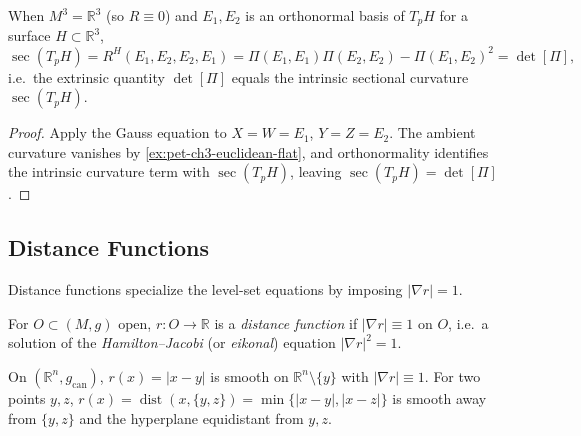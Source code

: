 \begin{corollary}
  \label{cor:pet-ch3-gauss-egregium}


  When $M^3=\mathbb R^3$ (so $R\equiv0$) and $E_1,E_2$ is an orthonormal basis of
  $T_pH$ for a surface $H\subset\mathbb R^3$,
  \[
    \sec(T_pH)=R^H(E_1,E_2,E_2,E_1)=\Pi(E_1,E_1)\Pi(E_2,E_2)-\Pi(E_1,E_2)^2=\det[\Pi],
  \]
  i.e.\ the extrinsic quantity $\det[\Pi]$ equals the intrinsic sectional
  curvature $\sec(T_pH)$.
\end{corollary}
\begin{proof}
  \sketch
  Apply the Gauss equation to $X=W=E_1$, $Y=Z=E_2$. The ambient curvature
  vanishes by \cref{ex:pet-ch3-euclidean-flat}, and orthonormality identifies the intrinsic curvature term with
  $\sec(T_pH)$, leaving $\sec(T_pH)=\det[\Pi]$.
\end{proof}

\subsection{Distance Functions}

Distance functions specialize the level-set equations by imposing
$|\nabla r|=1$.

\begin{definition}
  \label{def:pet-ch3-distance-function}


  For $O\subset(M,g)$ open, $r:O\to\mathbb R$ is a \emph{distance function} if
  $|\nabla r|\equiv1$ on $O$, i.e.\ a solution of the \emph{Hamilton--Jacobi} (or
  \emph{eikonal}) equation $|\nabla r|^2=1$.
\end{definition}

\begin{example}
  \label{ex:pet-ch3-distance-to-points}


  On $(\mathbb R^n,g_{\mathrm{can}})$, $r(x)=|x-y|$ is smooth on $\mathbb
  R^n\setminus\{y\}$ with $|\nabla r|\equiv1$. For two points $y,z$,
  $r(x)=\operatorname{dist}(x,\{y,z\})=\min\{|x-y|,|x-z|\}$ is smooth away from
  $\{y,z\}$ and the
  hyperplane equidistant from $y,z$.
\end{example}

